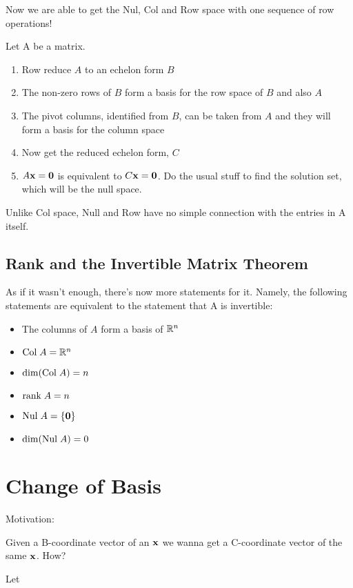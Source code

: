 \documentclass{report}
\begin{document}
Now we are able to get the Nul, Col and Row space with one sequence of row operations!
\begin{tcolorbox}[colback=blue!5!white, colframe=blue!75!black, title=Getting the trio]
Let A be a matrix.
\begin{enumerate}
    \item Row reduce $A$ to an echelon form $B$
    \item The non-zero rows of $B$ form a basis for the row space of $B$ and also $A$
    \item The pivot columns, identified from $B$, can be taken from $A$ and they will 
    form a basis for the column space
    \item Now get the reduced echelon form, $C$
    \item $A\mathbf{x} = \mathbf{0}$ is equivalent to $C\mathbf{x} = \mathbf{0}$. Do the usual stuff to find the 
    solution set, which will be the null space.
\end{enumerate}
Unlike Col space, Null and Row have no simple connection with the entries in A itself.
\end{tcolorbox}

\subsection{Rank and the Invertible Matrix Theorem}
As if it wasn't enough, there's now more statements for it.
Namely, the following statements are equivalent to the statement that A is invertible:
\begin{itemize}
    \item The columns of $A$ form a basis of $\mathbb{R}^n$
    \item $\mathrm{Col}\; A = \mathbb{R}^n$
    \item $\dim (\mathrm{Col}\; A) = n$
    \item $\mathrm{rank}\; A = n$
    \item $\mathrm{Nul}\; A = \{\mathbf{0}\}$
    \item $\dim (\mathrm{Nul}\; A) = 0$
\end{itemize}

\section{Change of Basis}

Motivation:

Given a B-coordinate vector of an $\mathbf{x}$ we wanna get a C-coordinate
vector of the same $\mathbf{x}$. How?

\begin{theorem}
    Let 
\end{theorem}
\end{document}
